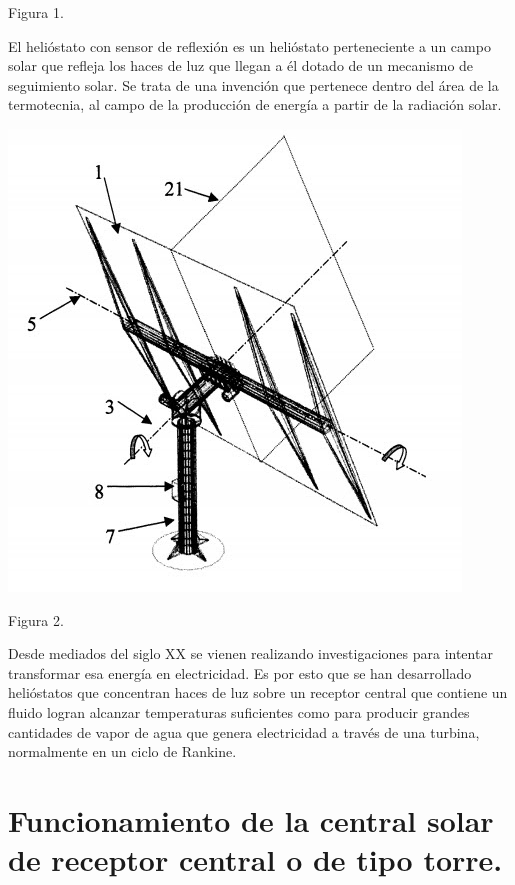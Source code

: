 \documentclass[12pt]{article}
\begin{document}
Figura 1.

El helióstato con sensor de reflexión es un helióstato perteneciente a un campo solar que refleja los haces de luz que llegan a él dotado de un mecanismo de seguimiento solar. Se trata de una invención que pertenece dentro del área de la termotecnia, al campo de la producción de energía a partir de la radiación solar.

\includegraphics[width=\textwidth]{unnamed.jpg}
\cite{OepmWebSite}

Figura 2.

Desde mediados del siglo XX se vienen realizando investigaciones para intentar transformar esa energía en electricidad. Es por esto que se han desarrollado helióstatos que concentran haces de luz sobre un receptor central que contiene un fluido logran alcanzar temperaturas suficientes como para producir grandes cantidades de vapor de agua que genera electricidad a través de una turbina, normalmente en un ciclo de Rankine.

\cite{GstriatumWebSite} \cite{EcuRedWebSite}

\section{Funcionamiento de la central solar de receptor central o de tipo torre.}
\end{document}
